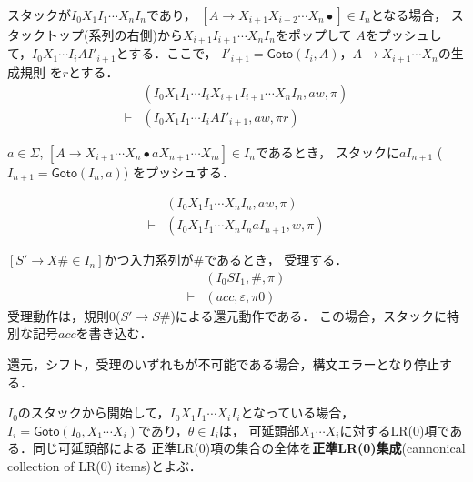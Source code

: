 \documentclass[a4j,dvipdfmx]{jbook}
\begin{document}
\begin{list}{}{}
  \item [{\bf 還元}]
        スタックが$I_0X_1I_1\cdots X_{n}I_n$であり，
        $[A\rightarrow X_{i+1}X_{i+2}\cdots X_n\bullet]\in I_n$となる場合，
        スタックトップ(系列の右側)から$X_{i+1}I_{i+1}\cdots X_nI_n$をポップして
        $A$をプッシュして，$I_0X_1\cdots I_iAI'_{i+1}$とする．ここで，
        $I'_{i+1}=\mathsf{Goto}(I_i,A)$，$A\rightarrow X_{i+1}\cdots X_n$の生成規則
        を$r$とする．
        \[\begin{array}{cl}
                   & (I_0X_1I_1\cdots I_iX_{i+1}I_{i+1}\cdots X_nI_n,aw,\pi) \\
            \vdash & (I_0X_1I_1\cdots I_iAI'_{i+1},aw,\pi r)
          \end{array}\]

  \item [{\bf シフト}]
        $a\in\Sigma$,
        $[A\rightarrow X_{i+1}\cdots X_n\bullet a X_{n+1}\cdots X_m]\in I_n$であるとき，
        スタックに$a I_{n+1}$ ($I_{n+1}=\mathsf{Goto}(I_n,a)$) をプッシュする．

        \[\begin{array}{cl}
                   & (I_0X_1I_1\cdots X_nI_n,aw,\pi)          \\
            \vdash & (I_0X_1I_1\cdots X_nI_n a I_{n+1},w,\pi)
          \end{array}
        \]
  \item [{\bf 受理}]
        $[S'\rightarrow X\texttt{\#}\in I_n]$かつ入力系列が$\texttt{\#}$であるとき，
        受理する．
        \[\begin{array}{cl}
                   & (I_0SI_1,\texttt{\#},\pi) \\
            \vdash & (acc,\varepsilon,\pi 0)
          \end{array}\]
        受理動作は，規則0($S'\rightarrow S\texttt{\#}$)による還元動作である．
        この場合，スタックに特別な記号$acc$を書き込む．
  \item [{\bf エラー}]
        還元，シフト，受理のいずれもが不可能である場合，構文エラーとなり停止する．
\end{list}

$I_0$のスタックから開始して，$I_0X_1I_1\cdots X_iI_i$となっている場合，
$I_i=\mathsf{Goto}(I_0,X_1\cdots X_i)$であり，$\theta\in I_i$は，
可延頭部$X_1\cdots X_i$に対するLR(0)項である．同じ可延頭部による
正準LR(0)項の集合の全体を{\bf 正準LR(0)集成}(cannonical collection of
LR(0) items)とよぶ．
\end{document}
